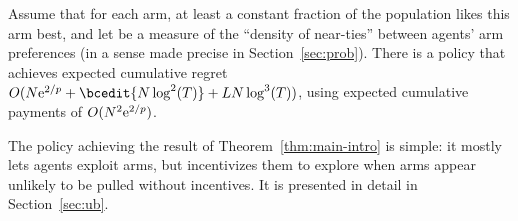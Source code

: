 



\begin{theorem} \label{thm:main-intro}
Assume that for each arm, at least a constant fraction \MinProb
of the population likes this arm best,
and let \TieDensity be a measure of the ``density of near-ties''
between agents' arm preferences
(in a sense made precise in Section~\ref{sec:prob}).
There is a policy that achieves expected 
    cumulative regret $O (\ARMNUM \e^{2/\MinProb} + \bcedit{\ARMNUM \log^2(T)} + \TieDensity \ARMNUM \log^3(T))$,
using expected cumulative payments of $O(N^2 \mathrm{e}^{2/p})$.
\end{theorem}


The policy achieving the result of Theorem~\ref{thm:main-intro} is
simple: it mostly lets agents exploit arms, but incentivizes
them to explore when arms appear unlikely to be pulled without incentives.
It is presented in detail in Section~\ref{sec:ub}.
